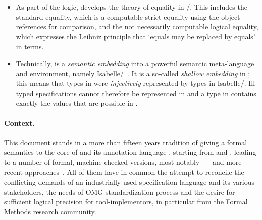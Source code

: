 \begin{itemize}
 \item As part of the \OCL logic,  \FOCL develops the theory of
         equality in \UML/\OCL. This includes the standard equality, which is a
         computable strict equality using the object references for comparison,
         and the not necessarily computable logical equality, which expresses
         the Leibniz principle that `equals may be replaced by equals' in 
         \OCL terms.
 \item Technically,  \FOCL is a \emph{semantic embedding} into a 
         powerful semantic meta-language and
         environment, namely Isabelle/\HOL~\cite{nipkow.ea:isabelle:2002}.
         It is a so-called \emph{shallow embedding} in \HOL; this means that types
         in \OCL were \emph{injectively} represented by types in Isabelle/\HOL. 
         Ill-typed \OCL specifications cannot therefore be represented in
          \FOCL and a type in  \FOCL contains exactly
         the values that are possible in \OCL\@. 
\end{itemize}

\paragraph{Context.} This document stands in a  more than fifteen years  tradition of 
giving a formal semantics to the core of \UML and its annotation language \OCL,
starting from \citet{richters:precise:2002} and   
\cite{hamie.ea:reflections:1998,mandel.ea:ocl:1999,cook.ea::amsterdam:2002},
leading to a number of formal, machine-checked versions, most notably \HOL-\OCL
~\cite{brucker.ea:semantic:2006-b,brucker.ea:hol-ocl-book:2006,brucker.ea:extensible:2008-b}
and more recent approaches~\cite{DBLP:conf/models/BruckerLTW13}. All of them
have in common
the attempt to reconcile the conflicting demands of an industrially used 
specification language and its various stakeholders, the needs of OMG 
standardization process and the desire for sufficient logical precision 
for tool-implementors, in particular from the Formal Methods research community.        

